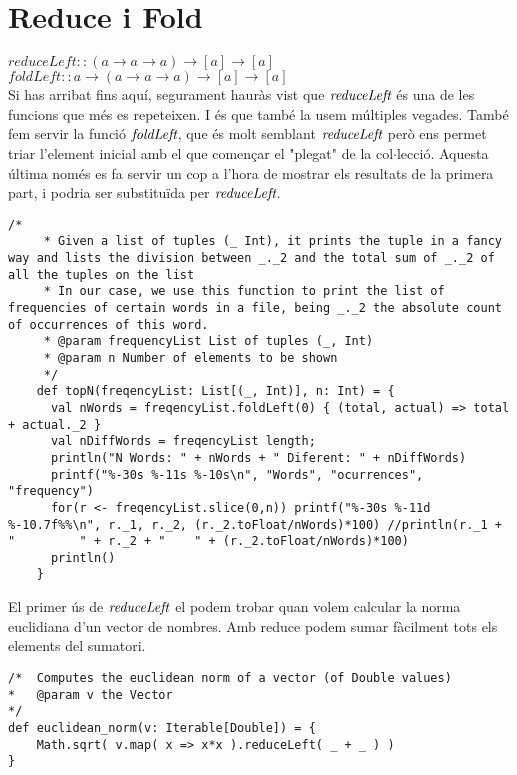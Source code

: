 \documentclass{report}
\begin{document}
\newpage

\section{Reduce i Fold}

$ reduceLeft :: (a \rightarrow a \rightarrow a) \rightarrow [a] \rightarrow [a] $ \\
$ foldLeft :: a \rightarrow (a \rightarrow a \rightarrow a) \rightarrow [a] \rightarrow [a] $ \\

Si has arribat fins aquí, segurament hauràs vist que $\emph{reduceLeft}$ és una de les funcions que més es repeteixen. I és que també la usem múltiples vegades. També fem servir la funció $ \emph{foldLeft}$, que és molt semblant $\emph{reduceLeft}$ però ens permet triar l'element inicial amb el que començar el "plegat" de la col$\cdot$lecció. Aquesta última només es fa servir un cop a l'hora de mostrar els resultats de la primera part, i podria ser substituïda per $\emph{reduceLeft}$.

\begin{lstlisting}[style=scalaHighlight]
/*
     * Given a list of tuples (_ Int), it prints the tuple in a fancy way and lists the division between _._2 and the total sum of _._2 of all the tuples on the list
     * In our case, we use this function to print the list of frequencies of certain words in a file, being _._2 the absolute count of occurrences of this word.
     * @param frequencyList List of tuples (_, Int)
     * @param n Number of elements to be shown
     */
    def topN(freqencyList: List[(_, Int)], n: Int) = {
      val nWords = freqencyList.foldLeft(0) { (total, actual) => total + actual._2 }
      val nDiffWords = freqencyList length;
      println("N Words: " + nWords + " Diferent: " + nDiffWords)
      printf("%-30s %-11s %-10s\n", "Words", "ocurrences", "frequency")
      for(r <- freqencyList.slice(0,n)) printf("%-30s %-11d %-10.7f%%\n", r._1, r._2, (r._2.toFloat/nWords)*100) //println(r._1 + "			" + r._2 + "	" + (r._2.toFloat/nWords)*100)
      println()
    }
\end{lstlisting}

El primer ús de $\emph{reduceLeft}$ el podem trobar quan volem calcular la norma euclidiana d'un vector de nombres. Amb reduce podem sumar fàcilment tots els elements del sumatori.

\begin{lstlisting}[style=scalaHighlight]
/*	Computes the euclidean norm of a vector (of Double values)
*	@param v the Vector
*/
def euclidean_norm(v: Iterable[Double]) = {
    Math.sqrt( v.map( x => x*x ).reduceLeft( _ + _ ) )
}
\end{lstlisting}
\end{document}
